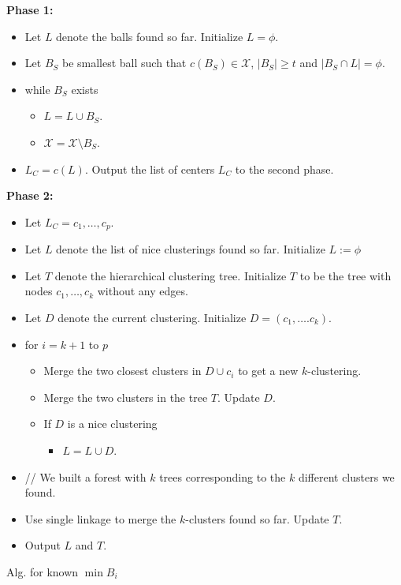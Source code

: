 \documentclass[11pt]{article}
\newenvironment{alg}{
    \begin{list}{}{
        \setlength{\itemsep}{2pt}
        \setlength{\parsep}{0pt}
        \setlength{\parskip}{0pt}
        \setlength{\topsep}{1pt}
    }
}
{
    \end{list}
}
\begin{document}
\begin{algorithm}
\begin{alg}
\item[] \textbf{Phase 1:}
\begin{itemize}
\item[] Let $L$ denote the balls found so far. Initialize $L = \phi$.
\item[] Let $B_S$ be smallest ball such that $c(B_S) \in \mathcal{X}$, $|B_S| \ge t$  and $|B_S \cap L | = \phi$.
\item[] while $B_S$ exists
\begin{itemize}
\item[] $L = L \cup B_S$. 
\item[] $\mathcal{X} = \mathcal{X}\setminus B_S$.
\end{itemize}
\item[] $L_C = c(L)$. Output the list of centers $L_C$ to the second phase.
\end{itemize}

\item[] \textbf{Phase 2:}
\begin{itemize}
\item[] Let $L_C = c_1,\ldots,c_p$.
\item[] Let $L$ denote the list of nice clusterings found so far. Initialize $L := \phi$
\item[] Let $T$ denote the hierarchical clustering tree. Initialize $T$ to be the tree with nodes $c_1,\ldots,c_k$ without any edges.
\item[] Let $D$ denote the current clustering. Initialize $D = (c_1,\ldots.c_k)$.
\item[] for $i=k+1$ to $p$
\begin{itemize}
\item[] Merge the two closest clusters in $D\cup c_i$ to get a new $k$-clustering. 
\item[] Merge the two clusters in the tree $T$. Update $D$. 
\item[] If $D$ is a nice clustering
\begin{itemize}
\item[] $L = L \cup D$.
\end{itemize}
\end{itemize}

\item[] // We built a forest with $k$ trees corresponding to the $k$ different clusters we found. 
\item[] Use single linkage to merge the $k$-clusters found so far. Update $T$.
\item[] Output $L$ and $T$.
\end{itemize}
\label{alg:Known}
\end{alg}
\caption{Alg. for known $\min{B_i}$}
\end{algorithm}
\end{document}
